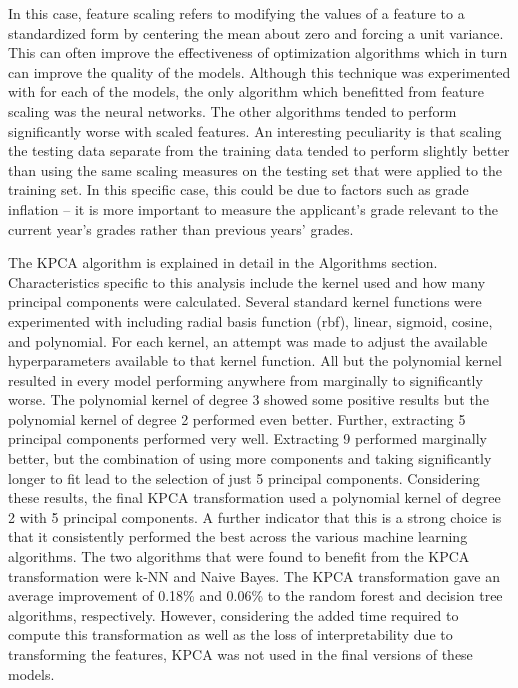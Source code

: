 In this case, feature scaling refers to modifying the values of a feature to a standardized form by centering the mean about zero and forcing a unit variance. This can often improve the effectiveness of optimization algorithms which in turn can improve the quality of the models. Although this technique was experimented with for each of the models, the only algorithm which benefitted from feature scaling was the neural networks. The other algorithms tended to perform significantly worse with scaled features. An interesting peculiarity is that scaling the testing data separate from the training data tended to perform slightly better than using the same scaling measures on the testing set that were applied to the training set. In this specific case, this could be due to factors such as grade inflation -- it is more important to measure the applicant's grade relevant to the current year's grades rather than previous years' grades.

The KPCA algorithm is explained in detail in the Algorithms section. Characteristics specific to this analysis include the kernel used and how many principal components were calculated. Several standard kernel functions were experimented with including radial basis function (rbf), linear, sigmoid, cosine, and polynomial. For each kernel, an attempt was made to adjust the available hyperparameters available to that kernel function. All but the polynomial kernel resulted in every model performing anywhere from marginally to significantly worse. The polynomial kernel of degree 3 showed some positive results but the polynomial kernel of degree 2 performed even better. Further, extracting 5 principal components performed very well. Extracting 9 performed marginally better, but the combination of using more components and taking significantly longer to fit lead to the selection of just 5 principal components. Considering these results, the final KPCA transformation used a polynomial kernel of degree 2 with 5 principal components. A further indicator that this is a strong choice is that it consistently performed the best across the various machine learning algorithms. The two algorithms that were found to benefit from the KPCA transformation were k-NN and Naive Bayes. The KPCA transformation gave an average improvement of 0.18\% and 0.06\% to the random forest and decision tree algorithms, respectively. However, considering the added time required to compute this transformation as well as the loss of interpretability due to transforming the features, KPCA was not used in the final versions of these models.



